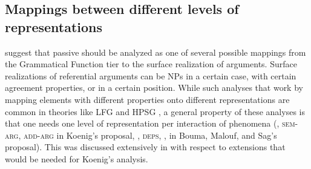 \begin{exe}
\begin{xlist}[iv.]
\begin{exe}
\begin{xlist}[iv.]
\subsection{Mappings between different levels of representations}
\label{sec-mapping-between-levels}\label{sec-inheritance-passive-SimSyn}

\citet[Chapter~6.3]{CJ2005a} suggest that passive should be analyzed as one of several possible mappings from the
Grammatical Function tier to the surface realization of arguments. Surface realizations of
referential arguments can be NPs in a certain case, with certain agreement properties, or in a certain position. While such analyses that work by
mapping elements with different properties onto different representations are common in theories
like LFG and HPSG \citep*{Koenig99a,BMS2001a}, a general property of these analyses is that one
needs one level of representation per interaction of phenomena (\argst, \textsc{sem-arg}, \textsc{add-arg}
in Koenig's proposal, \argst, \textsc{deps}, \spr, \comps in Bouma, Malouf, and Sag's proposal). This
was discussed extensively in  with respect to extensions
that would be needed for Koenig's analysis. 


\end{xlist}
\end{exe}
\end{xlist}
\end{exe}
